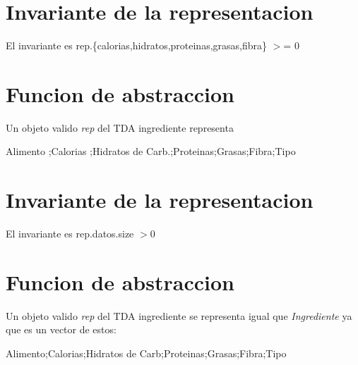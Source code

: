\hypertarget{repConjunto_invConjunto}{}\section{Invariante de la representacion}\label{repConjunto_invConjunto}
El invariante es rep.\{calorias,hidratos,proteinas,grasas,fibra\} $>$= 0\hypertarget{repConjunto_faConjunto}{}\section{Funcion de abstraccion}\label{repConjunto_faConjunto}
Un objeto valido {\itshape rep} del T\+DA ingrediente representa

Alimento ;Calorias ;Hidratos de Carb.;Proteinas;Grasas;Fibra;Tipo\hypertarget{repConjunto_invConjunto}{}\section{Invariante de la representacion}\label{repConjunto_invConjunto}
El invariante es rep.\+datos.\+size $>$0\hypertarget{repConjunto_faConjunto}{}\section{Funcion de abstraccion}\label{repConjunto_faConjunto}
Un objeto valido {\itshape rep} del T\+DA ingrediente se representa igual que {\itshape Ingrediente} ya que es un vector de estos\+:

Alimento;Calorias;Hidratos de Carb;Proteinas;Grasas;Fibra;Tipo 